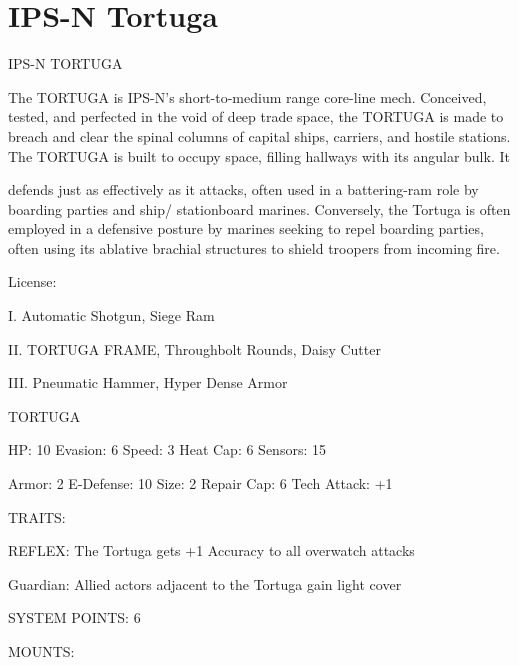 \section{IPS-N Tortuga}

                                                   IPS-N TORTUGA  

The TORTUGA is IPS-N’s short-to-medium range core-line mech. Conceived, tested, and perfected in the  
void of deep trade space, the TORTUGA is made to breach and clear the spinal columns of capital ships,  
carriers, and hostile stations. The TORTUGA is built to occupy space, filling hallways with its angular bulk. It  

                                                                                                                               


defends just as effectively as it attacks, often used in a battering-ram role by boarding parties and ship/ 
stationboard marines. Conversely, the Tortuga is often employed in a defensive posture by marines seeking  
to repel boarding parties, often using its ablative brachial structures to shield troopers from incoming fire.     

                                                   License:
 
I. Automatic Shotgun, Siege Ram
 
II. TORTUGA FRAME, Throughbolt Rounds, Daisy Cutter
 
III. Pneumatic Hammer, Hyper Dense Armor
 

                                                 TORTUGA 

  HP: 10         Evasion: 6                            Speed: 3           Heat Cap: 6        Sensors: 15 

  Armor: 2       E-Defense: 10                         Size: 2            Repair Cap: 6      Tech Attack:  
                                                                                             +1 

                                                   TRAITS: 

  REFLEX: The Tortuga gets +1 Accuracy to all overwatch attacks
 
  Guardian: Allied actors adjacent to the Tortuga gain light cover  

                                             SYSTEM POINTS: 6 

                                                   MOUNTS: 

